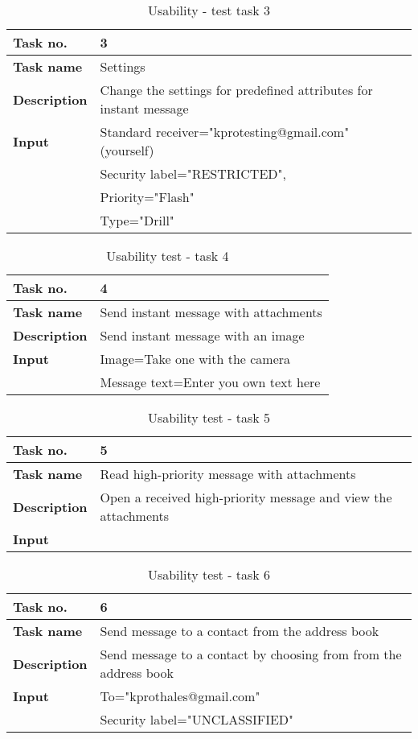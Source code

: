 		\begin{table}
			\begin{tabular}{>{\bfseries}l l}	
				Task no.&3\\ \hline
				Task name&Settings\\ \hline
				Description&Change the settings for predefined attributes for instant message\\ \hline
				Input&Standard receiver="kprotesting@gmail.com" (yourself)\\
					& Security label="RESTRICTED",\\
					&Priority="Flash"\\
					& Type="Drill"\\ \hline
			\end{tabular}
			\caption{Usability - test task 3} \label{tab:usabilitytask3}
		\end{table}
		\begin{table}
			\begin{tabular}{>{\bfseries}l l}	
				Task no.&4\\ \hline
				Task name&Send instant message with attachments\\ \hline
				Description&Send instant message with an image\\ \hline
				Input &Image=Take one with the camera\\
					&Message text=Enter you own text here\\ \hline
			\end{tabular}
			\caption{Usability test - task 4} \label{tab:usabilitytask4}
		\end{table}
		\begin{table}
			\begin{tabular}{>{\bfseries}l l}	
				Task no.&5\\ \hline
				Task name&Read high-priority message with attachments\\ \hline
				Description&Open a received high-priority message and view the attachments\\ \hline
				Input&\\ \hline
			\end{tabular}
			\caption{Usability test - task 5} \label{tab:usabilitytask5}
		\end{table}
		\begin{table}
			\begin{tabular}{>{\bfseries}l l}	
				Task no.&6\\ \hline
				Task name&Send message to a contact from the address book\\ \hline
				Description&Send message to a contact by choosing from from the address book\\ \hline
				Input&To="kprothales@gmail.com"\\
					&Security label="UNCLASSIFIED"\\ \hline
			\end{tabular}
			\caption{Usability test - task 6} \label{tab:usabilitytask6}
		\end{table}
			
